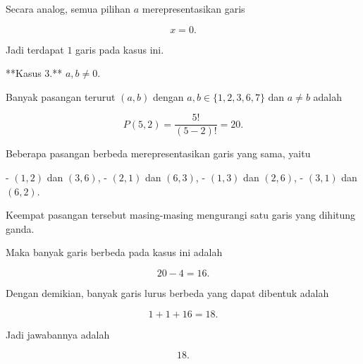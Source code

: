 Secara analog, semua pilihan $a$ merepresentasikan garis

$$
x=0.
$$

Jadi terdapat $1$ garis pada kasus ini.

**Kasus 3.** $a,b\neq0$.

Banyak pasangan terurut $(a,b)$ dengan $a,b\in\{1,2,3,6,7\}$ dan $a\neq b$ adalah

$$
P(5,2)=\frac{5!}{(5-2)!}=20.
$$

Beberapa pasangan berbeda merepresentasikan garis yang sama, yaitu

- $(1,2)$ dan $(3,6)$,
- $(2,1)$ dan $(6,3)$,
- $(1,3)$ dan $(2,6)$,
- $(3,1)$ dan $(6,2)$.

Keempat pasangan tersebut masing-masing mengurangi satu garis yang dihitung ganda.

Maka banyak garis berbeda pada kasus ini adalah

$$
20-4=16.
$$

Dengan demikian, banyak garis lurus berbeda yang dapat dibentuk adalah

$$
1+1+16=18.
$$

Jadi jawabannya adalah

$$
\boxed{18}.
$$
